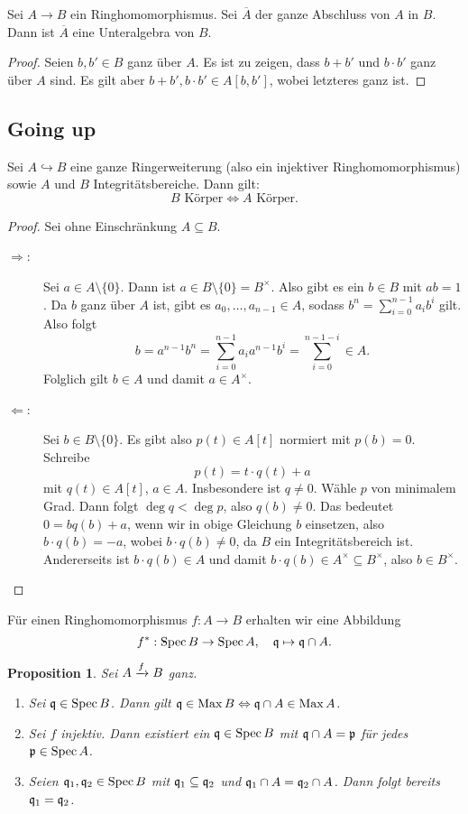 \documentclass[12pt,a4paper]{scrartcl}
\theoremstyle{cplain}
\newtheorem{prop}[thmcounter]{Proposition}
\theoremstyle{cdef}
\begin{document}
\begin{kor}
	Sei $A\to B$ ein Ringhomomorphismus. Sei $\overline{A}$ der ganze Abschluss von $A$ in $B$. Dann ist $\overline{A}$ eine Unteralgebra von $B$.
\end{kor}
\begin{proof}
	Seien $b, b'\in B$ ganz über $A$. Es ist zu zeigen, dass $b+b'$ und $b\cdot b'$ ganz über $A$ sind. Es gilt aber $b+b', b\cdot b'\in A[b, b']$, wobei letzteres ganz ist.
\end{proof}

\subsection{Going up}
\begin{lem} \label{lem:6.7}
	Sei $A\hookrightarrow B$ eine ganze Ringerweiterung (also ein injektiver Ringhomomorphismus) sowie $A$ und $B$ Integritätsbereiche. Dann gilt: 
	\[B \text{ Körper}\Longleftrightarrow A\text{ Körper}.\]
\end{lem}
\begin{proof} Sei ohne Einschränkung $A\subseteq B$.
\begin{description}
	\item[\glqq$\Rightarrow$\grqq:] Sei $a\in A\setminus \{0\}$. Dann ist $a\in B\setminus\{0\} = B^{\times}$. Also gibt es ein $b\in B$ mit $ab = 1$. Da $b$ ganz über $A$ ist, gibt es $a_0,\dots, a_{n-1}\in A$, sodass $b^n = \sum_{i = 0}^{n-1}a_ib^i$ gilt. Also folgt
	\[ b = a^{n-1}b^n = \sum_{i = 0}^{n-1} a_ia^{n-1}b^i = \sum_{i = 0}^{n-1-i}\in A. \]
	Folglich gilt $b\in A$ und damit $a\in A^{\times}$.
	\item[\glqq$\Leftarrow$\grqq:] Sei $b\in B\setminus\{0\}$. Es gibt also $p(t) \in A[t]$ normiert mit $p(b) = 0$. Schreibe
	$$p(t) = t\cdot q(t) + a$$
	mit $q(t)\in A[t]$, $a\in A$. Insbesondere ist $q\neq 0$. Wähle $p$ von minimalem Grad. Dann folgt $\deg q < \deg p$, also $q(b) \neq 0$. Das bedeutet $0 = bq(b)+a$, wenn wir in obige Gleichung $b$ einsetzen, also $b\cdot q(b)  = -a$, wobei $b\cdot q(b) \neq 0$, da $B$ ein Integritätsbereich ist. Andererseits ist $b\cdot q(b) \in A$ und damit $b\cdot q(b) \in A^{\times}\subseteq B^{\times}$, also $b\in B^{\times}$.
	\qedhere
\end{description}	
\end{proof}
Für einen Ringhomomorphismus $f\colon A \to B$ erhalten wir eine Abbildung \[f^*: \operatorname{Spec} B\to \operatorname{Spec} A, \quad \mathfrak{q}\mapsto \mathfrak{q}\cap A.\]
\begin{prop} \label{prop:6.8}
	Sei $A\xrightarrow{f} B$ ganz.
	\begin{enumerate}
		\item Sei $\mathfrak{q}\in \operatorname{Spec} B$. Dann gilt $\mathfrak{q}\in \operatorname{Max} B \Leftrightarrow \mathfrak{q}\cap A\in \operatorname{Max} A$. \label{thm:6.8:i}
		\item Sei $f$ injektiv. Dann existiert ein $\mathfrak{q} \in \operatorname{Spec} B$ mit $\mathfrak{q}\cap A = \mathfrak{p}$ für jedes $\mathfrak{p} \in \operatorname{Spec} A$. \label{thm:6.8:ii}
		\item Seien $\mathfrak{q}_1,\mathfrak{q}_2\in\operatorname{Spec} B$ mit $\mathfrak{q}_1\subseteq \mathfrak{q}_2$ und $\mathfrak{q}_1\cap A = \mathfrak{q}_2\cap A$. Dann folgt bereits $\mathfrak{q}_1 = \mathfrak{q}_2$. \label{thm:6.8:iii}
	\end{enumerate}
\end{prop}
\end{document}
